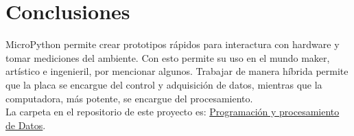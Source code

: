 \documentclass{assignment}
\begin{document}
	\section*{Conclusiones}
	MicroPython permite crear prototipos rápidos para interactura con hardware y tomar mediciones del ambiente. Con esto permite su uso en el mundo maker, artístico e ingenieril, por mencionar algunos. Trabajar de manera híbrida permite que la placa se encargue del control y adquisición de datos, mientras que la computadora, más potente, se encargue del procesamiento.\\
	La carpeta en el repositorio de este proyecto es: \href{https://github.com/clivan/Programacion_y_Procesamiento_de_Datos_Infotec/4A}{Programación y procesamiento de Datos}.	
\end{document}
